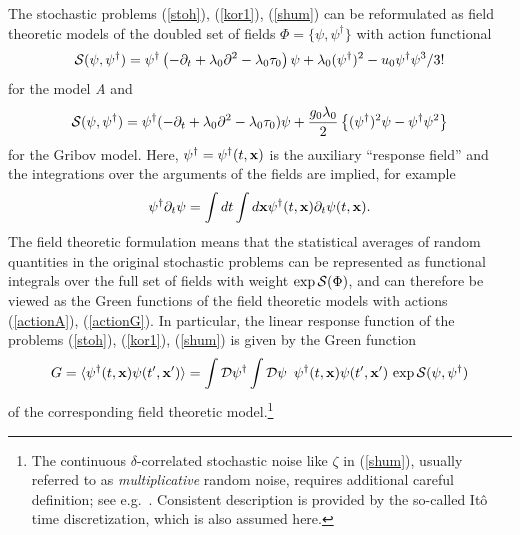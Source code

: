 \documentclass[12pt]{article}
\def\S{{\cal S}}
\begin{document}
The stochastic problems (\ref{stoh}), (\ref{kor1}), (\ref{shum}) can be
reformulated as field theoretic models of the
doubled set of fields $\Phi = \{\psi,\psi^{\dag}\}$ with action functional
\begin{eqnarray}
\S(\psi,\psi^{\dag}) =  \psi^{\dag}
\left(-\partial_{t}+\lambda_{0} \partial^{2}- \lambda_{0}\tau_{0}\right)
\psi + \lambda_{0} (\psi^{\dagger})^2 - u_{0} \psi^{\dag}\psi^3/3!
\label{actionA}
\end{eqnarray}
for the model {\it A} and
\begin{eqnarray}
\S(\psi,\psi^{\dag}) =  \psi^{\dag}
(-\partial_{t}+\lambda_{0} \partial^{2}- \lambda_{0}\tau_{0}) \psi
+ \frac{g_{0}\lambda_{0}}{2} \left\{ (\psi^{\dagger})^2\psi -
\psi^{\dagger}\psi^2  \right\}
\label{actionG}
\end{eqnarray}
for the Gribov model.
Here, $\psi^{\dag}=\psi^{\dag}(t,{\bf x})$ is the auxiliary ``response
field'' and the integrations over the arguments of the fields are implied,
for example
\[  \psi^{\dag}\partial_{t}\psi = \int dt \int d{\bf x}
\psi^{\dag}(t,{\bf x})\partial_{t}\psi(t,{\bf x}). \]
The field theoretic formulation means that the statistical averages
of random quantities in the original stochastic problems can be represented
as functional integrals over the full set of fields with weight
$\exp {\cal S}(\Phi)$, and can therefore be viewed as the Green functions
of the field theoretic models with actions (\ref{actionA}), (\ref{actionG}).
In particular, the linear response function of the problems
(\ref{stoh}), (\ref{kor1}), (\ref{shum}) is given by the Green function
\begin{eqnarray}
G=\langle \psi^{\dag}(t, {\bf x}) \psi(t', {\bf x'} ) \rangle =
\int {\cal D}\psi^{\dag} \int {\cal D} \psi\ \,
\psi^{\dag}(t, {\bf x}) \psi(t', {\bf x'})\, \exp {\cal S}(\psi,\psi^{\dag})
\label{respd}
\end{eqnarray}
of the corresponding field theoretic model.\footnote{The continuous
$\delta$-correlated stochastic noise like $\zeta$ in (\ref{shum}), usually
referred to as {\it multiplicative} random noise, requires additional
careful definition; see e.g.~\cite{vanK}. Consistent description is provided
by the so-called It\^{o} time discretization, which is also assumed here.}
\end{document}
